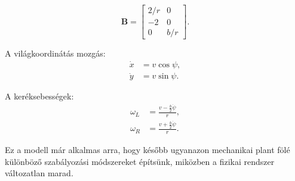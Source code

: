 \documentclass[12pt,a4paper]{article}
\begin{document}
	\begin{equation}
		\bm B=
		\begin{bmatrix}
			2/r & 0\\
			-2 & 0\\
			0 & b/r
		\end{bmatrix}.
	\end{equation}
	
	A világkoordinátás mozgás:
	\begin{align}
		\dot x&=v\cos\psi,\\
		\dot y&=v\sin\psi.
	\end{align}
	
	A keréksebességek:
	\begin{align}
		\omega_L&=\frac{v-\frac{b}{2}\dot\psi}{r},\\
		\omega_R&=\frac{v+\frac{b}{2}\dot\psi}{r}.
	\end{align}
	
	Ez a modell már alkalmas arra, hogy később ugyanazon mechanikai plant fölé különböző szabályozási módszereket építsünk, miközben a fizikai rendszer változatlan marad.
	
\end{document}
